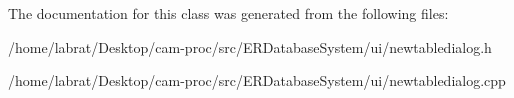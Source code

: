 The documentation for this class was generated from the following files\+:\begin{DoxyCompactItemize}
\item 
/home/labrat/\+Desktop/cam-\/proc/src/\+E\+R\+Database\+System/ui/newtabledialog.\+h\item 
/home/labrat/\+Desktop/cam-\/proc/src/\+E\+R\+Database\+System/ui/newtabledialog.\+cpp\end{DoxyCompactItemize}
